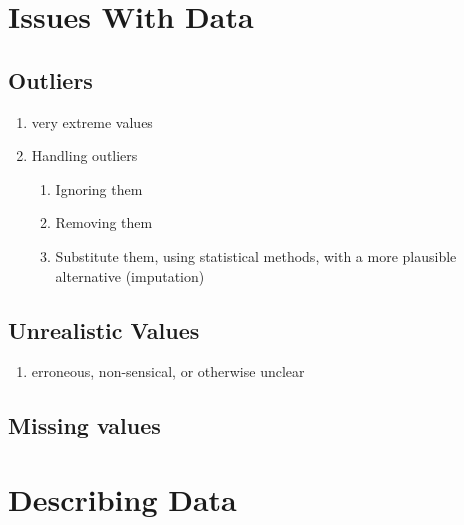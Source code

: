 \section{Issues With Data}
\subsection{Outliers \cite{ism-1}}\label{outliers}
\begin{enumerate}
    \item very extreme values
    \item Handling outliers
    \begin{enumerate}
        \item Ignoring them
        \item Removing them
        \item Substitute them, using statistical methods, with a more plausible alternative (imputation)
    \end{enumerate}
\end{enumerate}

\subsection{Unrealistic Values \cite{ism-1}}\label{unrealistic_values}
\begin{enumerate}
    \item erroneous, non-sensical, or otherwise unclear
\end{enumerate}

\subsection{Missing values \cite{ism-1}}\label{missing_values}

\section{Describing Data \cite{ism-1}}

